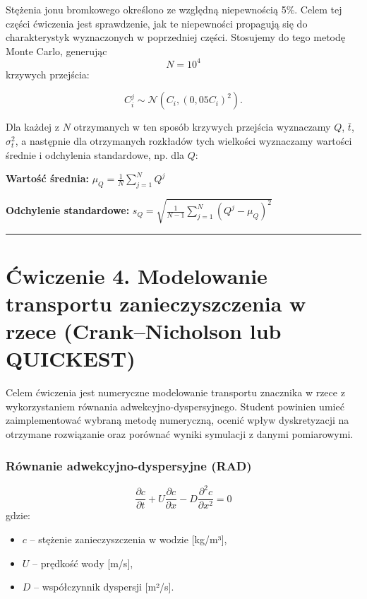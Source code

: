 \documentclass[
  polish,
  letterpaper,
  DIV=11,
  numbers=noendperiod]{scrartcl}
\providecommand{\tightlist}{%
  \setlength{\itemsep}{0pt}\setlength{\parskip}{0pt}}
\begin{document}
Stężenia jonu bromkowego określono ze względną niepewnością 5\%. Celem
tej części ćwiczenia jest sprawdzenie, jak te niepewności propagują się
do charakterystyk wyznaczonych w poprzedniej części. Stosujemy do tego
metodę Monte Carlo, generując \[N=10^4\] krzywych przejścia:

\[
C_i^j \sim \mathcal{N}\left(C_i,(0{,}05C_i)^2\right).
\]

Dla każdej z \(N\) otrzymanych w ten sposób krzywych przejścia
wyznaczamy \(Q\), \(\bar{t}\), \(\sigma_t^2\), a następnie dla
otrzymanych rozkładów tych wielkości wyznaczamy wartości średnie i
odchylenia standardowe, np. dla \(Q\):

\textbf{Wartość średnia:} \(\mu_Q=\frac{1}{N}\sum_{j=1}^{N}Q^j\)

\textbf{Odchylenie standardowe:}
\(s_Q=\sqrt{\frac{1}{N-1}\sum_{j=1}^{N}(Q^j-\mu_Q)^2}\)

\begin{center}\rule{0.5\linewidth}{0.5pt}\end{center}

\section{Ćwiczenie 4. Modelowanie transportu zanieczyszczenia w rzece
(Crank--Nicholson lub
QUICKEST)}\label{ux107wiczenie-4.-modelowanie-transportu-zanieczyszczenia-w-rzece-cranknicholson-lub-quickest}

Celem ćwiczenia jest numeryczne modelowanie transportu znacznika w rzece
z wykorzystaniem równania adwekcyjno-dyspersyjnego. Student powinien
umieć zaimplementować wybraną metodę numeryczną, ocenić wpływ
dyskretyzacji na otrzymane rozwiązanie oraz porównać wyniki symulacji z
danymi pomiarowymi.

\subsubsection{Równanie adwekcyjno-dyspersyjne
(RAD)}\label{ruxf3wnanie-adwekcyjno-dyspersyjne-rad}

\[
\frac{\partial c}{\partial t}  +U\frac{\partial c}{\partial x}  -D\frac{\partial^2 c}{\partial x^2}=0
\] gdzie:

\begin{itemize}
\tightlist
\item
  \(c\) -- stężenie zanieczyszczenia w wodzie {[}kg/m³{]},
\item
  \(U\) -- prędkość wody {[}m/s{]},
\item
  \(D\) -- współczynnik dyspersji {[}m²/s{]}.
\end{itemize}
\end{document}
